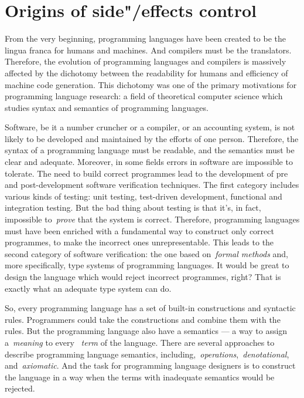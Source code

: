 \section{Origins of side"/effects control}

From the very beginning, programming languages have been created to be the lingua franca
for humans and machines. And compilers must be the translators.
Therefore, the evolution of programming languages and compilers is
massively affected by the dichotomy between the readability for humans and efficiency
of machine code generation. This dichotomy was one of the primary motivations for
programming language research: a field of theoretical computer science which
studies syntax and semantics of programming languages.

Software, be it a number cruncher or a compiler, or
an accounting system, is not likely to be developed and maintained by the efforts
of one person. Therefore, the syntax of a programming language must be readable,
and the semantics must be clear and adequate. Moreover, in some fields errors in
software are impossible to tolerate. The need to build correct programmes lead to the
development of pre and post-development software verification techniques. The first
category includes various kinds of testing: unit testing, test-driven development,
functional and integration testing. But the bad thing about testing is that it's,
in fact, impossible to~\emph{prove} that the system is correct.
Therefore, programming languages must have been enriched with a fundamental way
to construct only correct programmes, to make the incorrect ones unrepresentable.
This leads to the second category of software verification: the one based
on~\emph{formal methods} and, more specifically, type systems of programming
languages. It would be great to design the language which would reject incorrect
programmes, right? That is exactly what an adequate type system can do.

So, every programming language has a set of built-in constructions and syntactic rules.
Programmers could take the constructions and combine them with the rules. But the programming
language also have a semantics --- a way to assign a~\emph{meaning} to every ~\emph{term}
of the language. There are several approaches to describe programming language
semantics, including,~\emph{operations},~\emph{denotational}, and~\emph{axiomatic}.
And the task for programming language designers is to construct
the language in a way when the terms with inadequate semantics would be rejected.

